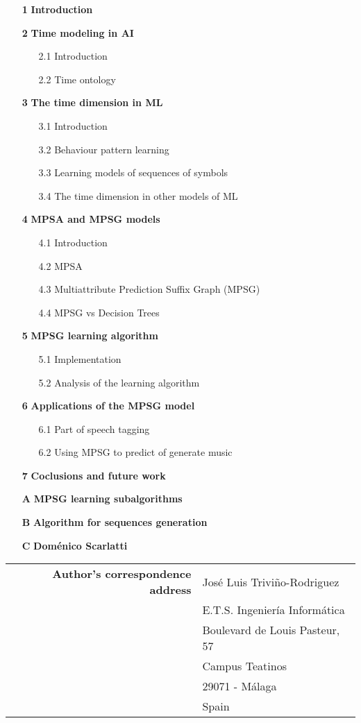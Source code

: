 \documentclass[final]{beatcs}
\begin{document}
\begin{itemize}
\item[\textbf{1}] \textbf{Introduction }
\item[\textbf{2}] \textbf{Time modeling in AI }
  \begin{itemize}
    \item[2.1] Introduction 
    \item[2.2] Time ontology 
  \end{itemize}
\item[\textbf{3}] \textbf{The time dimension in ML }
  \begin{itemize}
    \item[3.1] Introduction 
    \item[3.2] Behaviour pattern learning 
    \item[3.3] Learning models of sequences of symbols 
    \item[3.4] The time dimension in other models of ML 
  \end{itemize}
\item[\textbf{4}] \textbf{MPSA and MPSG models }
  \begin{itemize}
    \item[4.1] Introduction 
    \item[4.2] MPSA 
    \item[4.3] Multiattribute Prediction Suffix Graph (MPSG) 
    \item[4.4] MPSG vs Decision Trees 
  \end{itemize}
\item[\textbf{5}] \textbf{MPSG learning algorithm }
  \begin{itemize}
    \item[5.1] Implementation 
    \item[5.2] Analysis of the learning algorithm 
  \end{itemize}
\item[\textbf{6}] \textbf{Applications of the MPSG model }
  \begin{itemize}
    \item[6.1] Part of speech tagging 
    \item[6.2] Using MPSG to predict of generate music 
  \end{itemize}
\item[\textbf{7}] \textbf{Coclusions and future work }
\item[\textbf{A}] \textbf{MPSG learning subalgorithms }
\item[\textbf{B}] \textbf{Algorithm for sequences generation }
\item[\textbf{C}] \textbf{Doménico Scarlatti }
\end{itemize}

\vspace{1cm}

\begin{tabular}{r l}
  \textbf{Author's correspondence address} & José Luis Triviño-Rodriguez \\
  & E.T.S. Ingeniería Informática \\
  & Boulevard de Louis Pasteur, 57 \\
  & Campus Teatinos \\
  & 29071 - Málaga \\
  & Spain
\end{tabular}
\end{document}
